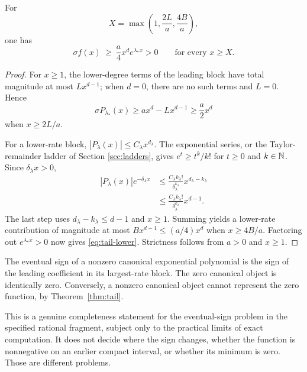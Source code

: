 \begin{theorem}
\label{thm:tail}
For
\begin{equation}
 X=\max\left(1,\frac{2L}{a},\frac{4B}{a}\right),
 \label{eq:cutoff}
\end{equation}
one has
\begin{equation}
 \sigma f(x)\ \ge\ \frac{a}{4}x^d e^{\lambda_*x}>0
 \qquad\text{for every }x\ge X.
 \label{eq:tail-lower}
\end{equation}
\end{theorem}
\begin{proof}
For $x\ge1$, the lower-degree terms of the leading block have total magnitude
at most $Lx^{d-1}$; when $d=0$, there are no such terms and $L=0$. Hence
\[
 \sigma P_{\lambda_*}(x)
 \ge ax^d-Lx^{d-1}\ge\frac{a}{2}x^d
\]
when $x\ge2L/a$.

For a lower-rate block, $|P_\lambda(x)|\le C_\lambda x^{d_\lambda}$.
The exponential series, or the Taylor-remainder ladder of Section
\ref{sec:ladders}, gives $e^t\ge t^k/k!$ for $t\ge0$ and $k\in\mathbb N$.
Since $\delta_\lambda x>0$,
\begin{align*}
 |P_\lambda(x)|e^{-\delta_\lambda x}
 &\le\frac{C_\lambda k_\lambda!}
             {\delta_\lambda^{k_\lambda}}
       x^{d_\lambda-k_\lambda}\\
 &\le\frac{C_\lambda k_\lambda!}
             {\delta_\lambda^{k_\lambda}}
       x^{d-1}.
\end{align*}
The last step uses $d_\lambda-k_\lambda\le d-1$ and $x\ge1$.
Summing yields a lower-rate contribution of magnitude at most
$Bx^{d-1}\le(a/4)x^d$ when $x\ge4B/a$. Factoring out
$e^{\lambda_*x}>0$ now gives \eqref{eq:tail-lower}. Strictness follows from
$a>0$ and $x\ge1$.
\end{proof}

\begin{corollary}
The eventual sign of a nonzero canonical exponential polynomial is the sign
of the leading coefficient in its largest-rate block. The zero canonical
object is identically zero. Conversely, a nonzero canonical object cannot
represent the zero function, by Theorem~\ref{thm:tail}.
\end{corollary}

This is a genuine completeness statement for the eventual-sign problem in the
specified rational fragment, subject only to the practical limits of exact
computation. It does not decide where the sign changes, whether the function
is nonnegative on an earlier compact interval, or whether its minimum is zero.
Those are different problems.

